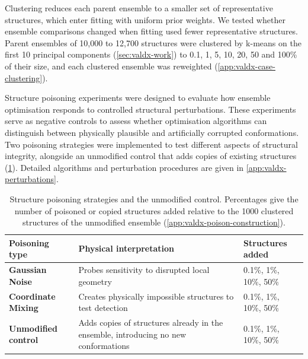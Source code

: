 Clustering reduces each parent ensemble to a smaller set of representative structures, which enter fitting with uniform prior weights. We tested whether ensemble comparisons changed when fitting used fewer representative structures. Parent ensembles of 10,000 to 12,700 structures were clustered by k-means on the first 10 principal components (\cref{sec:valdx-work}) to 0.1, 1, 5, 10, 20, 50 and 100\% of their size, and each clustered ensemble was reweighted (\cref{app:valdx-case-clustering}).

Structure poisoning experiments were designed to evaluate how ensemble optimisation responds to controlled structural perturbations. These experiments serve as negative controls to assess whether optimisation algorithms can distinguish between physically plausible and artificially corrupted conformations. Two poisoning strategies were implemented to test different aspects of structural integrity, alongside an unmodified control that adds copies of existing structures (\cref{tab:valdx-poisoning}). Detailed algorithms and perturbation procedures are given in \cref{app:valdx-perturbations}.

\begin{table}[htbp]
    \centering
    \small
    \begin{tabularx}{\textwidth}{@{}l>{\raggedright\arraybackslash}Xl@{}}
    \toprule
        \textbf{Poisoning type} & \textbf{Physical interpretation} & \textbf{Structures added} \\
        \midrule
        \textbf{Gaussian Noise} & Probes sensitivity to disrupted local geometry & 0.1\%, 1\%, 10\%, 50\% \\
        \textbf{Coordinate Mixing} & Creates physically impossible structures to test detection & 0.1\%, 1\%, 10\%, 50\% \\
        \textbf{Unmodified control} & Adds copies of structures already in the ensemble, introducing no new conformations & 0.1\%, 1\%, 10\%, 50\% \\
        \bottomrule
    \end{tabularx}
    \caption{Structure poisoning strategies and the unmodified control. Percentages give the number of poisoned or copied structures added relative to the 1000 clustered structures of the unmodified ensemble (\cref{app:valdx-poison-construction}).}
    \label{tab:valdx-poisoning}
\end{table}

